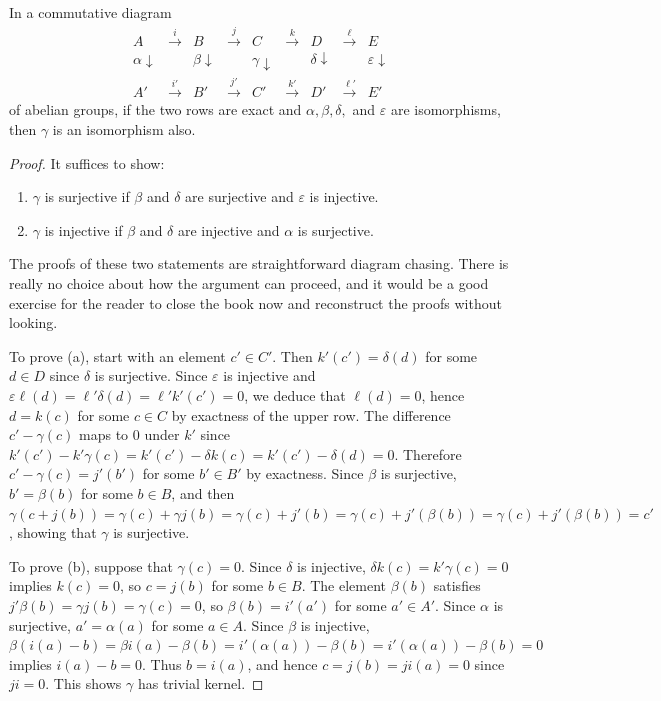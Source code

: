 \begin{lemma}
\label{lem:five-lemma}
\uses{}
In a commutative diagram
\[
\begin{array}{ccccccccc}
A & \xrightarrow{i} & B & \xrightarrow{j} & C & \xrightarrow{k} & D & \xrightarrow{\ell} & E \\
\alpha \downarrow & & \beta \downarrow & & \gamma \downarrow & & \delta \downarrow & & \varepsilon \downarrow \\
A' & \xrightarrow{i'} & B' & \xrightarrow{j'} & C' & \xrightarrow{k'} & D' & \xrightarrow{\ell'} & E'
\end{array}
\]
of abelian groups, if the two rows are exact and $\alpha, \beta, \delta,$ and $\varepsilon$ are isomorphisms, then $\gamma$ is an isomorphism also.
\end{lemma}

\begin{proof}
It suffices to show:
\begin{enumerate}
\item[(a)] $\gamma$ is surjective if $\beta$ and $\delta$ are surjective and $\varepsilon$ is injective.
\item[(b)] $\gamma$ is injective if $\beta$ and $\delta$ are injective and $\alpha$ is surjective.
\end{enumerate}

The proofs of these two statements are straightforward diagram chasing. There is really no choice about how the argument can proceed, and it would be a good exercise for the reader to close the book now and reconstruct the proofs without looking.

To prove (a), start with an element $c' \in C'$. Then $k'(c') = \delta(d)$ for some $d \in D$ since $\delta$ is surjective. Since $\varepsilon$ is injective and $\varepsilon \ell(d) = \ell' \delta(d) = \ell' k'(c') = 0$, we deduce that $\ell(d) = 0$, hence $d = k(c)$ for some $c \in C$ by exactness of the upper row. The difference $c' - \gamma(c)$ maps to $0$ under $k'$ since $k'(c') - k'\gamma(c) = k'(c') - \delta k(c) = k'(c') - \delta(d) = 0$. Therefore $c' - \gamma(c) = j'(b')$ for some $b' \in B'$ by exactness. Since $\beta$ is surjective, $b' = \beta(b)$ for some $b \in B$, and then $\gamma(c + j(b)) = \gamma(c) + \gamma j(b) = \gamma(c) + j'(b) = \gamma(c) + j'(\beta(b)) = \gamma(c) + j'(\beta(b)) = c'$, showing that $\gamma$ is surjective.

To prove (b), suppose that $\gamma(c) = 0$. Since $\delta$ is injective, $\delta k(c) = k' \gamma(c) = 0$ implies $k(c) = 0$, so $c = j(b)$ for some $b \in B$. The element $\beta(b)$ satisfies $j' \beta(b) = \gamma j(b) = \gamma(c) = 0$, so $\beta(b) = i'(a')$ for some $a' \in A'$. Since $\alpha$ is surjective, $a' = \alpha(a)$ for some $a \in A$. Since $\beta$ is injective, $\beta(i(a) - b) = \beta i(a) - \beta(b) = i'(\alpha(a)) - \beta(b) = i'(\alpha(a)) - \beta(b) = 0$ implies $i(a) - b = 0$. Thus $b = i(a)$, and hence $c = j(b) = ji(a) = 0$ since $ji = 0$. This shows $\gamma$ has trivial kernel.
\end{proof}


